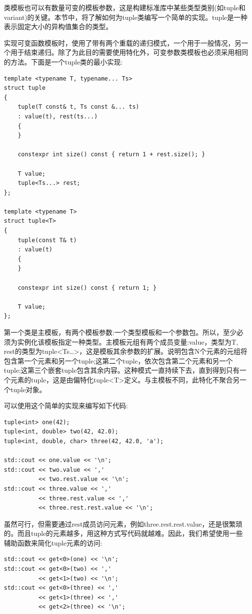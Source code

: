 类模板也可以有数量可变的模板参数，这是构建标准库中某些类型类别(如tuple和variant)的关键。本节中，将了解如何为tuple类编写一个简单的实现。tuple是一种表示固定大小的异构值集合的类型。

实现可变函数模板时，使用了带有两个重载的递归模式，一个用于一般情况，另一个用于结束递归。除了为此目的需要使用特化外，可变参数类模板也必须采用相同的方法。下面是一个tuple类的最小实现:

\begin{lstlisting}[style=styleCXX]
template <typename T, typename... Ts>
struct tuple
{
	tuple(T const& t, Ts const &... ts)
	: value(t), rest(ts...)
	{
	}

	constexpr int size() const { return 1 + rest.size(); }
	
	T value;
	tuple<Ts...> rest;
};

template <typename T>
struct tuple<T>
{
	tuple(const T& t)
	: value(t)
	{
	}

	constexpr int size() const { return 1; }
	
	T value;
};
\end{lstlisting}

第一个类是主模板，有两个模板参数:一个类型模板和一个参数包。所以，至少必须为实例化该模板指定一种类型。主模板元组有两个成员变量:value，类型为T, rest的类型为tuple<Ts…>，这是模板其余参数的扩展。说明包含N个元素的元组将包含第一个元素和另一个tuple;这第二个tuple，依次包含第二个元素和另一个tuple;这第三个嵌套tuple包含其余内容。这种模式一直持续下去，直到得到只有一个元素的tuple，这是由偏特化tuple<T>定义。与主模板不同，此特化不聚合另一个tuple对象。

可以使用这个简单的实现来编写如下代码:

\begin{lstlisting}[style=styleCXX]
tuple<int> one(42);
tuple<int, double> two(42, 42.0);
tuple<int, double, char> three(42, 42.0, 'a');

std::cout << one.value << '\n';
std::cout << two.value << ','
          << two.rest.value << '\n';
std::cout << three.value << ','
          << three.rest.value << ','
          << three.rest.rest.value << '\n';
\end{lstlisting}

虽然可行，但需要通过rest成员访问元素，例如three.rest.rest.value，还是很繁琐的。而且tuple的元素越多，用这种方式写代码就越难。因此，我们希望使用一些辅助函数来简化tuple元素的访问:

\begin{lstlisting}[style=styleCXX]
std::cout << get<0>(one) << '\n';
std::cout << get<0>(two) << ','
          << get<1>(two) << '\n';
std::cout << get<0>(three) << ','
          << get<1>(three) << ','
          << get<2>(three) << '\n';
\end{lstlisting}


